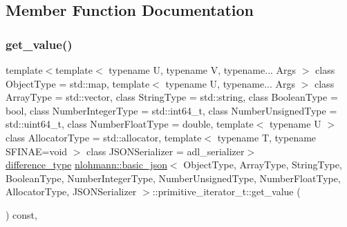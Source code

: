 \subsection{Member Function Documentation}
\mbox{\label{classnlohmann_1_1basic__json_1_1primitive__iterator__t_a2839e2447370eb34f5db9d4e2a81c757}} 
\subsubsection{\texorpdfstring{get\+\_\+value()}{get\_value()}}
{\footnotesize\ttfamily template$<$template$<$ typename U, typename V, typename... Args $>$ class Object\+Type = std\+::map, template$<$ typename U, typename... Args $>$ class Array\+Type = std\+::vector, class String\+Type  = std\+::string, class Boolean\+Type  = bool, class Number\+Integer\+Type  = std\+::int64\+\_\+t, class Number\+Unsigned\+Type  = std\+::uint64\+\_\+t, class Number\+Float\+Type  = double, template$<$ typename U $>$ class Allocator\+Type = std\+::allocator, template$<$ typename T, typename S\+F\+I\+N\+A\+E=void $>$ class J\+S\+O\+N\+Serializer = adl\+\_\+serializer$>$ \\
\hyperlink{classnlohmann_1_1basic__json_afe7c1303357e19cea9527af4e9a31d8f}{difference\+\_\+type} \hyperlink{classnlohmann_1_1basic__json}{nlohmann\+::basic\+\_\+json}$<$ Object\+Type, Array\+Type, String\+Type, Boolean\+Type, Number\+Integer\+Type, Number\+Unsigned\+Type, Number\+Float\+Type, Allocator\+Type, J\+S\+O\+N\+Serializer $>$\+::primitive\+\_\+iterator\+\_\+t\+::get\+\_\+value (\begin{DoxyParamCaption}{ }\end{DoxyParamCaption}) const\hspace{0.3cm}{\ttfamily [inline]}, {\ttfamily [noexcept]}}

\mbox{\label{classnlohmann_1_1basic__json_1_1primitive__iterator__t_a4a619406da55cf7bee028770ad02f26c}} 
